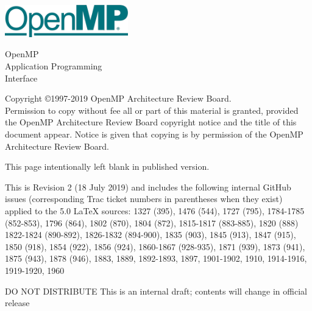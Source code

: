
  \begin{titlepage}
    \begin{flushleft}
     \hspace{-6em} \includegraphics[width=0.4\textwidth]{openmp-logo.png}
    \end{flushleft}

    \begin{adjustwidth}{-0.75in}{0in}
    \begin{center}
      \Huge
      \textsf{OpenMP\\Application Programming\\Interface}

      \vspace{0.5in}\textsf{    }\vspace{-0.7in}
      \normalsize

      \vspace{1.0in}

      \textbf{\ompversion{}}
    \end{center}
    \end{adjustwidth}

    \vspace{3.0in}

\begin{adjustwidth}{0pt}{1em}\setlength{\parskip}{0.25\baselineskip}%
Copyright \copyright 1997-2019 OpenMP Architecture Review Board.\\
Permission to copy without fee all or part of this material is granted,
provided the OpenMP Architecture Review Board copyright notice and
the title of this document appear. Notice is given that copying is by
permission of the OpenMP Architecture Review Board.\end{adjustwidth}

  \end{titlepage}


\clearpage
\thispagestyle{empty}
\phantom{a}
This page intentionally left blank in published version.

This is Revision 2 (18 July 2019) and includes the following internal 
GitHub issues (corresponding Trac ticket numbers in parentheses when
they exist) applied to the 5.0 LaTeX sources: 1327 (395), 1476 (544), 
1727 (795), 1784-1785 (852-853), 1796 (864), 1802 (870), 1804 (872), 
1815-1817 (883-885), 1820 (888) 1822-1824 (890-892), 1826-1832 (894-900), 
1835 (903), 1845 (913), 1847 (915), 1850 (918), 1854 (922), 1856 (924), 
1860-1867 (928-935), 1871 (939), 1873 (941), 1875 (943), 1878 (946), 
1883, 1889, 1892-1893, 1897, 1901-1902, 1910, 1914-1916, 1919-1920, 1960

DO NOT DISTRIBUTE
This is an internal draft; contents will change in official release

\vfill

